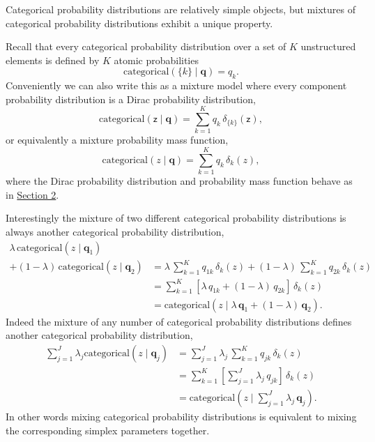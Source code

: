\documentclass[
  letterpaper,
  DIV=11,
  numbers=noendperiod]{scrartcl}
\begin{document}
Categorical probability distributions are relatively simple objects, but
mixtures of categorical probability distributions exhibit a unique
property.

Recall that every categorical probability distribution over a set of
\(K\) unstructured elements is defined by \(K\) atomic probabilities \[
\mathrm{categorical}( \{ k \} \mid \mathbf{q})
= q_{k}.
\] Conveniently we can also write this as a mixture model where every
component probability distribution is a Dirac probability distribution,
\[
\mathrm{categorical}( \mathsf{z} \mid \mathbf{q} )
=
\sum_{k = 1}^{K} q_{k} \, \delta_{ \{ k \} }( \mathsf{z} ),
\] or equivalently a mixture probability mass function, \[
\mathrm{categorical}( z \mid \mathbf{q})
=
\sum_{k = 1}^{K} q_{k} \, \delta_{ k }( z ),
\] where the Dirac probability distribution and probability mass
function behave as in \hyperref[sec:inflation]{Section 2}.

Interestingly the mixture of two different categorical probability
distributions is always another categorical probability distribution,
\begin{align*}
\lambda \, \mathrm{categorical}( z \mid \mathbf{q}_{1}) &
\\
+
(1 - \lambda) \, \mathrm{categorical}( z \mid \mathbf{q}_{2})
&=
\lambda \, \sum_{k = 1}^{K} q_{1k} \, \delta_{ k }( z )
+
(1 - \lambda) \, \sum_{k = 1}^{K} q_{2k} \, \delta_{ k }( z )
\\
&=
\sum_{k = 1}^{K}
\left[ \lambda \, q_{1k} + (1 - \lambda) \, q_{2k} \right]
\, \delta_{ k }( z )
\\
&=
\mathrm{categorical}( z \mid
\lambda \, \mathbf{q}_{1} + (1 - \lambda) \, \mathbf{q}_{2}).
\end{align*} Indeed the mixture of any number of categorical probability
distributions defines another categorical probability distribution,
\begin{align*}
\sum_{j = 1}^{J}
\lambda_{j} \mathrm{categorical}( z \mid \mathbf{q}_{j} )
&=
\sum_{j = 1}^{J} \lambda_{j} \,
\sum_{k = 1}^{K} q_{jk} \, \delta_{ k }( z )
\\
&=
\sum_{k = 1}^{K}
\left[ \sum_{j = 1}^{J} \lambda_{j} \, q_{jk} \right] \,
\delta_{ k }( z )
\\
&=
\mathrm{categorical}( z \mid
\textstyle \sum_{j = 1}^{J} \lambda_{j} \, \mathbf{q}_{j} ).
\end{align*} In other words mixing categorical probability distributions
is equivalent to mixing the corresponding simplex parameters together.
\end{document}
